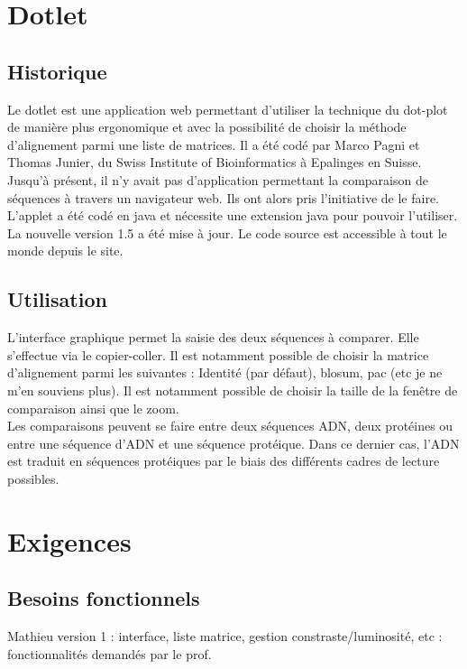 \documentclass{report}
\begin{document}


\chapter{Dotlet}

\section{Historique}

Le dotlet est une application web permettant d'utiliser la technique du dot-plot de manière plus ergonomique et avec la possibilité de choisir la méthode d'alignement parmi une liste de matrices. 
Il a été codé par Marco Pagni et Thomas Junier, du Swiss Institute of Bioinformatics à Epalinges en Suisse. Jusqu'à présent, il n'y avait pas d'application permettant la comparaison de séquences à travers un navigateur web. Ils ont alors pris l'initiative de le faire.\\
L'applet a été codé en java et nécessite une extension java pour pouvoir l'utiliser. La nouvelle version 1.5 a été mise à jour. Le code source est accessible à tout le monde depuis le site.\\


\section{Utilisation}

L'interface graphique permet la saisie des deux séquences à comparer. Elle s'effectue via le copier-coller. Il est notamment possible de choisir la matrice d'alignement parmi les suivantes : Identité (par défaut), blosum, pac (etc je ne m'en souviens plus). Il est notamment possible de choisir la taille de la fenêtre de comparaison ainsi que le zoom. \\
Les comparaisons peuvent se faire entre deux séquences ADN, deux protéines ou entre une séquence d'ADN et une séquence protéique. Dans ce dernier cas, l'ADN est traduit en séquences protéiques par le biais des différents cadres de lecture possibles.\\

\chapter{Exigences}
\section{Besoins fonctionnels}
Mathieu
version 1 : interface, liste matrice, gestion constraste/luminosité, etc : fonctionnalités demandés par le prof.
\end{document}

